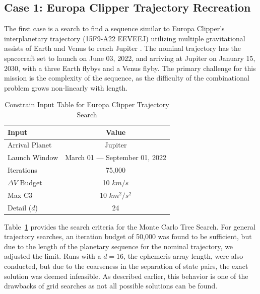 \documentclass[letterpaper, preprint, paper,11pt]{AAS}	%
\begin{document}
\subsection{Case 1: Europa Clipper Trajectory Recreation}

The first case is a search to find a sequence similar to Europa Clipper's interplanetary trajectory (15F9-A22 EEVEEJ) utilizing multiple gravitational assists of Earth and Venus to reach Jupiter \cite{Buffington2014}. The nominal trajectory has the spacecraft set to launch on June 03, 2022, and arriving at Jupiter on January 15, 2030, with a three Earth flybys and a Venus flyby. The primary challenge for this mission is the complexity of the sequence, as the difficulty of the combinational problem grows non-linearly with length.

\begin{table}[htb]
    \centering
    \caption{Constrain Input Table for Europa Clipper Trajectory Search}
    \label{table:clipInputs}
    \begin{tabular}{lc}
        \toprule
        \textbf{Input} & \textbf{Value}\\
        \midrule
        Arrival Planet & Jupiter \\
        Launch Window \hspace{1em}& March 01 --- September 01, 2022 \\
        Iterations & 75,000 \\
        $\Delta V$ Budget & 10 $km/s$ \\
        Max C3 & 10 $km^2/s^2$ \\
        Detail ($d$) & 24 \\
        \bottomrule
    \end{tabular}
\end{table}

Table~\ref*{table:clipInputs} provides the search criteria for the Monte Carlo Tree Search. For general trajectory searches, an iteration budget of 50,000 was found to be sufficient, but due to the length of the planetary sequence for the nominal trajectory, we adjusted the limit. Runs with a $d = 16$, the ephemeris array length, were also conducted, but due to the coarseness in the separation of state pairs, the exact solution was deemed infeasible. As described earlier, this behavior is one of the drawbacks of grid searches as not all possible solutions can be found.
\end{document}
